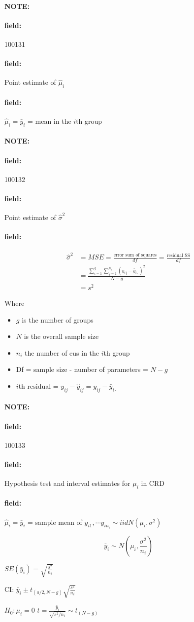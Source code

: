 \documentclass[12pt]{article}
\newenvironment{note}{\paragraph{NOTE:}}{}
\newenvironment{field}{\paragraph{field:}}{}
\begin{document}
\begin{note}
 \begin{field}
  \tiny 100131
 \end{field}
 \begin{field}
  Point estimate of $\hat{\mu}_i$
 \end{field}
 \begin{field}
  $\hat{\mu}_i = \bar{y}_i$ = mean in the $i$th group
 \end{field}
\end{note}

\begin{note}
 \begin{field}
  \tiny 100132
 \end{field}
 \begin{field}
  Point estimate of
  $\hat{\sigma}^2$
 \end{field}
 \begin{field}
  \begin{align}
   \hat{\sigma}^2 & = MSE = \frac{\text{error sum of squares}}{df} = \frac{\text{residual SS}}{df} \\
                  & = \frac{\sum_{i=1}^g \sum_{j=1}^{n_i}(y_{ij} - \bar{y}_{i\cdot})^2}{N-g}       \\
                  & = s^2
  \end{align}

  Where
  \begin{itemize}
   \item $g$ is the number of groups
   \item $N$ is the overall sample size
   \item $n_i$ the number of eus in the $i$th group
   \item Df = sample size - number of parameters = $N-g$
   \item $i$th residual = $y_{ij} - \hat{y}_{ij} = y_{ij} - \bar{y}_{i\cdot }$
  \end{itemize}
 \end{field}
\end{note}

\begin{note}
 \begin{field}
  \tiny 100133
 \end{field}
 \begin{field}
  Hypothesis test and interval estimates for $\mu_i$ in CRD
 \end{field}
 \begin{field}
  $\hat{\mu}_i = \bar{y}_i$ = sample mean of $y_{i1}, \cdots y_{in_{i}} \sim iid N(\mu_i,\sigma^2)$

  $$ \bar{y}_i \sim N(\mu_i, \frac{\sigma^2}{n_i})$$

  $SE(\bar{y}_i) = \sqrt{\frac{s^2}{n_i}}$

  CI: $\bar{y}_i \pm t_{(a/2,N-g)} \sqrt{\frac{s^2}{n_i}}$

  $H_0: \mu_i = 0$
  $t = \frac{\bar{y}_i}{\sqrt{s^2/n_i}} \sim t_{(N-g)}$

 \end{field}
\end{note}
\end{document}
